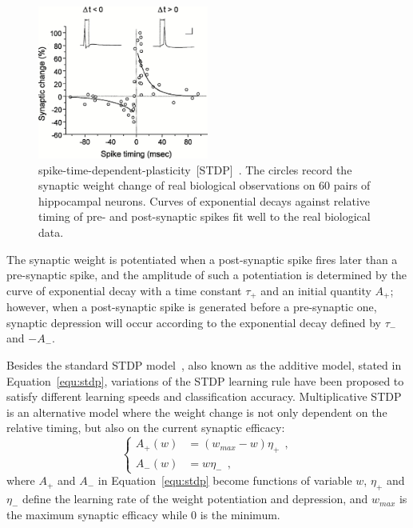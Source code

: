 \begin{figure}[bt!]
	\centering
	\includegraphics[width=0.5\textwidth]{pics_snn/stdp.jpeg}
	\caption{spike-time-dependent-plasticity~[STDP]~\citep{bi2001synaptic}.
	The circles record the synaptic weight change of real biological observations on 60 pairs of hippocampal neurons.
	Curves of exponential decays against relative timing of pre- and post-synaptic spikes fit well to the real biological data.
	}
	\label{Fig:STDP}
\end{figure}

The synaptic weight is potentiated when a post-synaptic spike fires later than a pre-synaptic spike, and the amplitude of such a potentiation is determined by the curve of exponential decay with a time constant $\tau_+$ and an initial quantity $A_+$;
however, when a post-synaptic spike is generated before a pre-synaptic one, synaptic depression will occur according to the exponential decay defined by $\tau_-$ and $-A_-$.

Besides the standard STDP model~\citep{song2000competitive}, also known as the additive model, stated in Equation~\ref{equ:stdp}, variations of the STDP learning rule have been proposed to satisfy different learning speeds and classification accuracy.
Multiplicative STDP~\citep{morrison2008phenomenological} is an alternative model where the weight change is not only dependent on the relative timing, but also on the current synaptic efficacy:
\begin{equation}
\left\{
\begin{aligned}
A_+ (w) &=  (w_{max} - w)\eta_+~~, \\
A_- (w) &= w\eta_-~~,
\end{aligned}
\right.
\end{equation}
where $A_+$ and $A_-$ in Equation~\ref{equ:stdp} become functions of variable 
$w$, $\eta_+$ and $\eta_-$ define the learning rate of the weight potentiation and depression, and $w_{max}$ is the maximum synaptic efficacy while 0 is the minimum.

